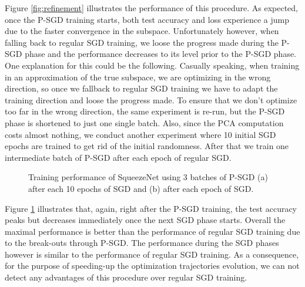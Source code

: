 \documentclass[11pt, a4paper]{article}
\begin{document}
Figure \ref{fig:refinement} illustrates the performance of this procedure. As expected, once the P-SGD training starts, both test accuracy and loss experience a jump due to the faster convergence in the subspace. Unfortunately however, when falling back to regular SGD training, we loose the progress made during the P-SGD phase and the performance decreases to its level prior to the P-SGD phase. One explanation for this could be the following. Casually speaking, when training in an approximation of the true subspace, we are optimizing in the wrong direction, so once we fallback to regular SGD training we have to adapt the training direction and loose the progress made. To ensure that we don't optimize too far in the wrong direction, the same experiment is re-run, but the P-SGD phase is shortened to just one single batch. Also, since the PCA computation costs almost nothing, we conduct another experiment where 10 initial SGD epochs are trained to get rid of the initial randomness. After that we train one intermediate batch of P-SGD after each epoch of regular SGD. \\

\begin{figure}[!h]
\centering
{}
\caption{\centering Training performance of SqueezeNet using 3 batches of P-SGD (a) after each 10 epochs of SGD and (b) after each epoch of SGD. }
\label{fig:refinement2}
\end{figure}

Figure \ref{fig:refinement2} illustrates that, again, right after the P-SGD training, the test accuracy peaks but decreases immediately once the next SGD phase starts. Overall the maximal performance is better than the performance of regular SGD training due to the break-outs through P-SGD. The performance during the SGD phases however is similar to the performance of regular SGD training. As a consequence, for the purpose of speeding-up the optimization trajectories evolution, we can not detect any advantages of this procedure over regular SGD training. \\
\end{document}
